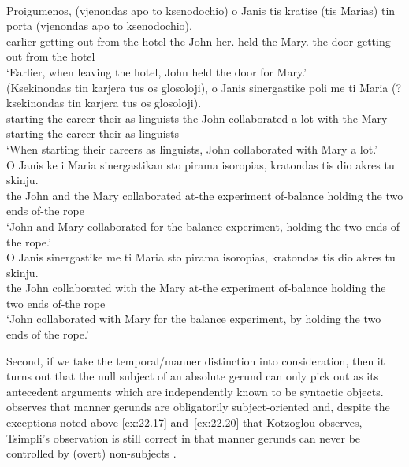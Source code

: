 \documentclass[output=paper]{langsci/langscibook}
\begin{document}
\ea%
    \label{ex:22.21} \\
    \gll    {}Proigumenos, (vjenondas apo   to   ksenodochio) o Janis tis   kratise  (tis Marias)\tss{} tin  porta (vjenondas apo   to   ksenodochio).\\
            earlier \hphantom{(}getting-out     from the hotel the  John her.\Cl{}  held \hphantom{(}the Mary.\Dat{}  the  door  \hphantom{(}getting-out    from the hotel\\
    \glt    \enquote*{Earlier, when leaving the hotel, John held the door for Mary.}
\ex%
\label{ex:22.22} \\
    \gll    (Ksekinondas tin karjera tus os glosoloji),  o  Janis  sinergastike  poli   me   ti Maria (?ksekinondas tin karjera tus os glosoloji).\\
            \hphantom{(}starting the career their as linguists  the  John collaborated a-lot with the Mary \hphantom{(?}starting the career their as linguists\\
    \glt    \enquote*{When starting their careers as linguists, John collaborated with Mary a lot.}
\ex%
    \label{ex:22.23} \\
    \gll    O  Janis   ke   i  Maria   sinergastikan sto   pirama     isoropias, kratondas   tis   dio akres  tu skinju.\\
            the John    and  the  Mary  collaborated  at-the  experiment  of-balance holding       the   two ends   of-the  rope\\
    \glt    \enquote*{John and Mary collaborated for the balance experiment, holding the two ends of the  rope.}
\ex%
    \label{ex:22.24} \\
    \gll    O      Janis sinergastike   me   ti Maria sto   pirama   isoropias, kratondas   tis   dio  akres  tu   skinju.\\
            the John  collaborated  with  the  Mary  at-the  experiment of-balance holding        the  two  ends  of-the  rope\\
    \glt    \enquote*{John collaborated with Mary for the balance experiment, by holding the two ends of the rope.}
\z

Second, if we take the temporal/manner distinction into consideration, then it
turns out that the null subject of an absolute gerund can only pick out as its
antecedent arguments which are independently known to be syntactic objects.
\citet{Tsimpli2000} observes that manner gerunds are obligatorily
subject-oriented and, despite the exceptions noted above \eqref{ex:22.17}
and~\eqref{ex:22.20} that Kotzoglou observes, Tsimpli’s observation is
still correct in that manner gerunds can never be controlled by (overt)
non-subjects .
\end{document}
